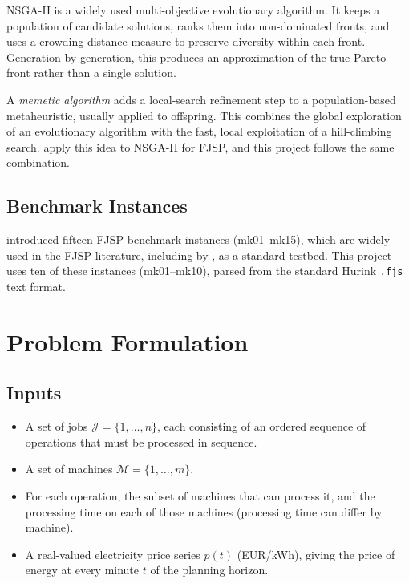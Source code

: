 \documentclass[11pt,a4paper]{article}
\begin{document}
NSGA-II \citep{deb2002fast} is a widely used multi-objective evolutionary algorithm. It keeps a
population of candidate solutions, ranks them into non-dominated fronts, and uses a crowding-distance
measure to preserve diversity within each front. Generation by generation, this produces an
approximation of the true Pareto front rather than a single solution.

A \emph{memetic algorithm} \citep{moscato2003gentle} adds a local-search refinement step to a
population-based metaheuristic, usually applied to offspring. This combines the global exploration of
an evolutionary algorithm with the fast, local exploitation of a hill-climbing search.
\citet{burmeister2024memetic} apply this idea to NSGA-II for FJSP, and this project follows the same
combination.

\subsection{Benchmark Instances}
\label{subsec:benchmark}

\citet{brandimarte1993routing} introduced fifteen FJSP benchmark instances (mk01--mk15), which are
widely used in the FJSP literature, including by \citet{burmeister2024memetic}, as a standard testbed.
This project uses ten of these instances (mk01--mk10), parsed from the standard Hurink \texttt{.fjs}
text format.

\section{Problem Formulation}
\label{sec:problem-formulation}

\subsection{Inputs}
\label{subsec:inputs}

\begin{itemize}
    \item A set of jobs $\mathcal{J} = \{1, \ldots, n\}$, each consisting of an ordered sequence of
    operations that must be processed in sequence.
    \item A set of machines $\mathcal{M} = \{1, \ldots, m\}$.
    \item For each operation, the subset of machines that can process it, and the processing time on
    each of those machines (processing time can differ by machine).
    \item A real-valued electricity price series $p(t)$ (EUR/kWh), giving the price of energy at
    every minute $t$ of the planning horizon.
\end{itemize}
\end{document}
